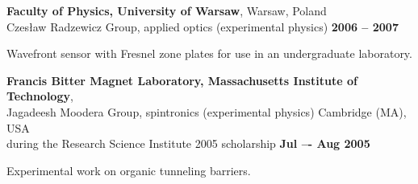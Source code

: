 \documentclass[margin,line]{resume}
\begin{document}
\begin{resume}
    {\bf Faculty of Physics, University of Warsaw}, Warsaw, Poland\\
    Czesław Radzewicz Group, applied optics (experimental physics) \hfill {\bf 2006 -- 2007}\\
    \begin{list2}
        \vspace*{-4mm}
        \item Wavefront sensor with Fresnel zone plates for use in an undergraduate laboratory.
    \end{list2}

    {\bf Francis Bitter Magnet Laboratory, Massachusetts Institute of Technology},\\
    Jagadeesh Moodera Group, spintronics (experimental physics) \hfill Cambridge (MA), USA\\
    during the Research Science Institute 2005 scholarship \hfill {\bf Jul –- Aug 2005}\\
    \begin{list2}
        \vspace*{-4mm}
        \item Experimental work on organic tunneling barriers.
    \end{list2}


\newpage



    



\end{resume}
\end{document}

